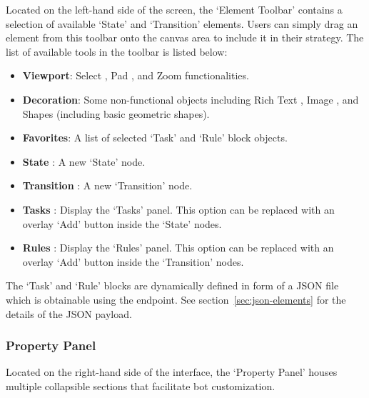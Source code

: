 Located on the left-hand side of the screen, the `Element Toolbar' contains a selection of available `State' and `Transition' elements. Users can simply drag an element from this toolbar onto the canvas area to include it in their strategy. The list of available tools in the toolbar is listed below:

\begin{itemize}
  \item \textbf{Viewport}: Select , Pad , and Zoom  functionalities.
  \item \textbf{Decoration}: Some non-functional objects including Rich Text , Image , and Shapes  (including basic geometric shapes).
  \item \textbf{Favorites}: A list of selected `Task' and `Rule' block objects.
  \item \textbf{State} : A new `State' node.
  \item \textbf{Transition} : A new `Transition' node.
  \item \textbf{Tasks} : Display the `Tasks' panel. This option can be replaced with an overlay `Add' button  inside the `State' nodes.
  \item \textbf{Rules} : Display the `Rules' panel. This option can be replaced with an overlay `Add' button  inside the `Transition' nodes.
\end{itemize}

The `Task' and `Rule' blocks are dynamically defined in form of a JSON file which is obtainable using the  endpoint. See section~\ref{sec:json-elements} for the details of the JSON payload.

\subsubsection{Property Panel}

Located on the right-hand side of the interface, the `Property Panel' houses multiple collapsible sections that facilitate bot customization. 

